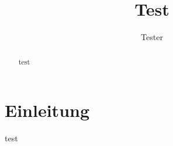 \documentclass{article}
\title{Test}
\author{Tester}
\begin{document}
	
\maketitle

\begin{abstract}
	test
\end{abstract}

\section{Einleitung}
test
\citep{yabuki1995heat}
\citep{nelson2005bibliography}
\citep{gordon1972chemist,hutchinson1979validity}




\end{document}
